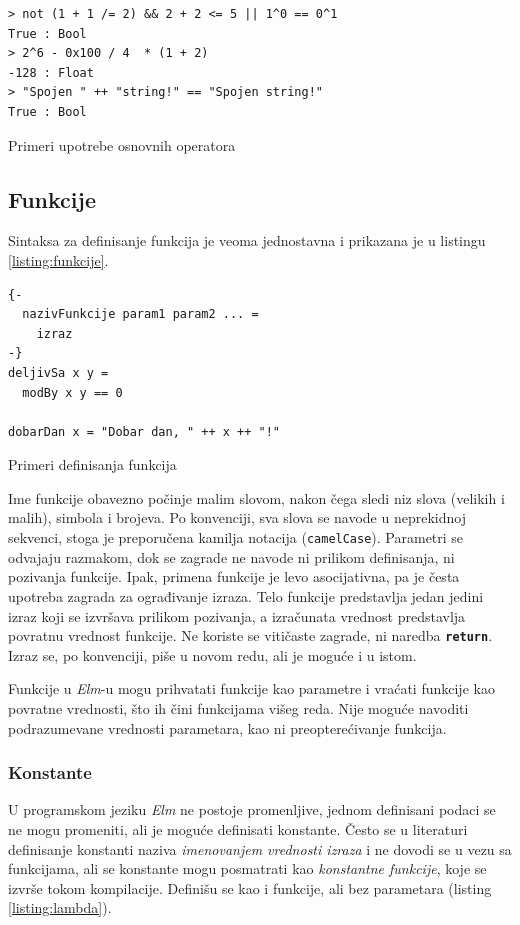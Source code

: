 \documentclass[12pt,oneside]{memoir}
\begin{document}
\begin{listing}[h]
\begin{verbatim}
> not (1 + 1 /= 2) && 2 + 2 <= 5 || 1^0 == 0^1 
True : Bool
> 2^6 - 0x100 / 4  * (1 + 2)
-128 : Float
> "Spojen " ++ "string!" == "Spojen string!"
True : Bool
\end{verbatim}
\caption{Primeri upotrebe osnovnih operatora}
\label{listing:operatori}
\end{listing}

\subsection{Funkcije}  
Sintaksa za definisanje funkcija je veoma jednostavna i prikazana je u listingu 
\ref{listing:funkcije}.
\begin{listing}[h]
\begin{verbatim}
{-
  nazivFunkcije param1 param2 ... =
    izraz  
-}
deljivSa x y =
  modBy x y == 0

dobarDan x = "Dobar dan, " ++ x ++ "!"  
\end{verbatim}
\caption{Primeri definisanja funkcija}
\label{listing:funkcije}
\end{listing}

Ime funkcije obavezno počinje malim slovom, nakon čega sledi niz slova (velikih i malih),
simbola \texttt{\textbf{\textunderscore}} i brojeva. Po konvenciji, sva slova se navode u
neprekidnoj sekvenci, stoga je preporučena kamilja notacija (\texttt{camelCase}).
Parametri se odvajaju razmakom, dok se zagrade ne navode ni prilikom definisanja, ni
pozivanja funkcije. Ipak, primena funkcije je levo asocijativna, pa je česta upotreba
zagrada za ograđivanje izraza. Telo funkcije predstavlja jedan jedini izraz koji se izvršava
prilikom pozivanja, a izračunata vrednost predstavlja povratnu vrednost funkcije. Ne koriste
se vitičaste zagrade, ni naredba \texttt{\textbf{return}}. Izraz se, po konvenciji, piše u
novom redu, ali je moguće i u istom.

Funkcije u \emph{Elm}-u mogu prihvatati funkcije kao parametre i vraćati funkcije kao 
povratne vrednosti, što ih čini funkcijama višeg reda. Nije moguće navoditi
podrazumevane vrednosti parametara, kao ni preopterećivanje funkcija.

\subsubsection{Konstante}
U programskom jeziku \emph{Elm} ne postoje promenljive, jednom definisani podaci se ne mogu promeniti, ali je 
moguće definisati konstante. Često se u literaturi definisanje konstanti naziva 
\emph{imenovanjem vrednosti izraza} i ne dovodi se u vezu sa funkcijama, ali se konstante 
mogu posmatrati kao \emph{konstantne funkcije}, koje se izvrše tokom kompilacije. Definišu se
kao i funkcije, ali bez parametara (listing \ref{listing:lambda}).
\end{document}
